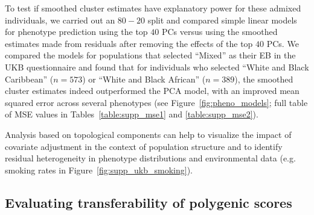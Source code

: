\clearpage

To test if smoothed cluster estimates have explanatory power for these admixed individuals, we carried out an $80-20$ split and compared simple linear models for phenotype prediction using the top $40$ PCs versus using the smoothed estimates made from residuals after removing the effects of the top $40$ PCs. We compared the models for populations that selected ``Mixed'' as their EB in the UKB questionnaire and found that for individuals who selected ``White and Black Caribbean'' ($n=573$) or ``White and Black African'' ($n=389$), the smoothed cluster estimates indeed outperformed the PCA model, with an improved mean squared error across several phenotypes (see Figure~\ref{fig:pheno_models}; full table of MSE values in Tables~\ref{table:supp_mse1} and \ref{table:supp_mse2}).

Analysis based on topological components can help to visualize the impact of covariate adjustment in the context of population structure and to identify residual heterogeneity in phenotype distributions and environmental data (e.g. smoking rates in Figure~\ref{fig:supp_ukb_smoking}).

\clearpage

\subsection{Evaluating transferability of polygenic scores}

